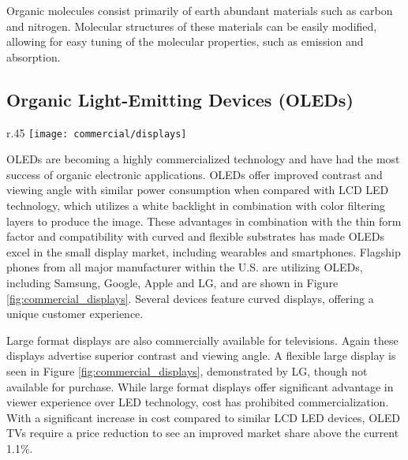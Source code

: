\documentclass[../thesis.tex]{subfiles}
\begin{document}
Organic molecules consist primarily of earth abundant materials such as carbon and nitrogen.  
Molecular structures of these materials can be easily modified, allowing for easy tuning of the molecular properties, such as emission and absorption.


\subsection{Organic Light-Emitting Devices (OLEDs)}

\begin{wrapfigure}{r}{.45\textwidth}
\centering
\texttt{[image: commercial/displays]}
\caption{(Top) Commercial OLED white lighting from OLEDworks. (Middle) Flexible OLED TV demo from LG.  (Bottom) Smartphones from Apple, Google and Samsung.}
\label{fig:commercial_displays}
\end{wrapfigure}

OLEDs are becoming a highly commercialized technology and have had the most success of organic electronic applications.\supercite{Han2014a,Soneira2016,Soneira2017,Kalyani2017}
OLEDs offer improved contrast and viewing angle with similar power consumption when compared with LCD LED technology, which utilizes a white backlight in combination with color filtering layers to produce the image. \supercite{Morrison2017} 
These advantages in combination with the thin form factor and compatibility with curved and flexible substrates has made OLEDs excel in the small display market, including wearables and smartphones.
Flagship phones from all major manufacturer within the U.S. are utilizing OLEDs, including Samsung, Google, Apple and LG, and are shown in Figure \ref{fig:commercial_displays}.\supercite{Rozario2017,Morrison2018}
Several devices feature curved displays, offering a unique customer experience.

Large format displays are also commercially available for televisions.\supercite{Rozario2017,Morrison2018}
Again these displays advertise superior contrast and viewing angle.
A flexible large display is seen in Figure \ref{fig:commercial_displays}, demonstrated by LG, though not available for purchase.\supercite{Statt2016}
While large format displays offer significant advantage in viewer experience over LED technology, cost has prohibited commercialization.\supercite{Statt2016}
With a significant increase in cost compared to similar LCD LED devices, OLED TVs require a price reduction to see an improved market share above the current 1.1\%.\supercite{Statista2018}
\end{document}
